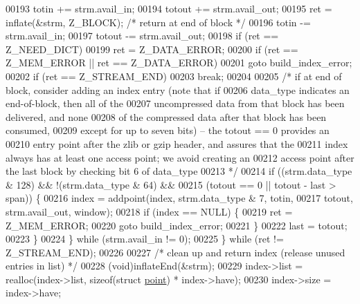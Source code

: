 \begin{DoxyCode}
00193             totin += strm.avail\_in;
00194             totout += strm.avail\_out;
00195             ret = inflate(&strm, Z\_BLOCK);      \textcolor{comment}{/* return at end of block */}
00196             totin -= strm.avail\_in;
00197             totout -= strm.avail\_out;
00198             \textcolor{keywordflow}{if} (ret == Z\_NEED\_DICT)
00199                 ret = Z\_DATA\_ERROR;
00200             \textcolor{keywordflow}{if} (ret == Z\_MEM\_ERROR || ret == Z\_DATA\_ERROR)
00201                 \textcolor{keywordflow}{goto} build\_index\_error;
00202             \textcolor{keywordflow}{if} (ret == Z\_STREAM\_END)
00203                 \textcolor{keywordflow}{break};
00204 
00205             \textcolor{comment}{/* if at end of block, consider adding an index entry (note that if}
00206 \textcolor{comment}{               data\_type indicates an end-of-block, then all of the}
00207 \textcolor{comment}{               uncompressed data from that block has been delivered, and none}
00208 \textcolor{comment}{               of the compressed data after that block has been consumed,}
00209 \textcolor{comment}{               except for up to seven bits) -- the totout == 0 provides an}
00210 \textcolor{comment}{               entry point after the zlib or gzip header, and assures that the}
00211 \textcolor{comment}{               index always has at least one access point; we avoid creating an}
00212 \textcolor{comment}{               access point after the last block by checking bit 6 of data\_type}
00213 \textcolor{comment}{             */}
00214             \textcolor{keywordflow}{if} ((strm.data\_type & 128) && !(strm.data\_type & 64) &&
00215                 (totout == 0 || totout - last > span)) \{
00216                 index = addpoint(index, strm.data\_type & 7, totin,
00217                                  totout, strm.avail\_out, window);
00218                 \textcolor{keywordflow}{if} (index == NULL) \{
00219                     ret = Z\_MEM\_ERROR;
00220                     \textcolor{keywordflow}{goto} build\_index\_error;
00221                 \}
00222                 last = totout;
00223             \}
00224         \} \textcolor{keywordflow}{while} (strm.avail\_in != 0);
00225     \} \textcolor{keywordflow}{while} (ret != Z\_STREAM\_END);
00226 
00227     \textcolor{comment}{/* clean up and return index (release unused entries in list) */}
00228     (void)inflateEnd(&strm);
00229     index->list = realloc(index->list, \textcolor{keyword}{sizeof}(\textcolor{keyword}{struct} \hyperlink{structpoint}{point}) * index->have);
00230     index->size = index->have;

\end{DoxyCode}
